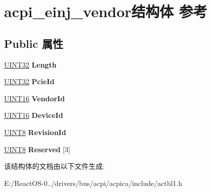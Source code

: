 \hypertarget{structacpi__einj__vendor}{}\section{acpi\+\_\+einj\+\_\+vendor结构体 参考}
\label{structacpi__einj__vendor}
\subsection*{Public 属性}
\begin{DoxyCompactItemize}
\item 
\mbox{\label{structacpi__einj__vendor_ab022b1c2b2f97624fa8f3c6d6956860f}} 
\hyperlink{_processor_bind_8h_ae1e6edbbc26d6fbc71a90190d0266018}{U\+I\+N\+T32} {\bfseries Length}
\item 
\mbox{\label{structacpi__einj__vendor_a0b31a8be0d24ead47e4321fdd5d7ec57}} 
\hyperlink{_processor_bind_8h_ae1e6edbbc26d6fbc71a90190d0266018}{U\+I\+N\+T32} {\bfseries Pcie\+Id}
\item 
\mbox{\label{structacpi__einj__vendor_ae98ed6cb710c90ef7fcc4b1a364ee571}} 
\hyperlink{_processor_bind_8h_a09f1a1fb2293e33483cc8d44aefb1eb1}{U\+I\+N\+T16} {\bfseries Vendor\+Id}
\item 
\mbox{\label{structacpi__einj__vendor_a0848c0802b4a8e1a7d9d8d412d630deb}} 
\hyperlink{_processor_bind_8h_a09f1a1fb2293e33483cc8d44aefb1eb1}{U\+I\+N\+T16} {\bfseries Device\+Id}
\item 
\mbox{\label{structacpi__einj__vendor_aa4a3d11dd6fc3b47ab571dab4133b4b7}} 
\hyperlink{_processor_bind_8h_ab27e9918b538ce9d8ca692479b375b6a}{U\+I\+N\+T8} {\bfseries Revision\+Id}
\item 
\mbox{\label{structacpi__einj__vendor_a1e73fb244b549c57887ef7763c0863f3}} 
\hyperlink{_processor_bind_8h_ab27e9918b538ce9d8ca692479b375b6a}{U\+I\+N\+T8} {\bfseries Reserved} \mbox{[}3\mbox{]}
\end{DoxyCompactItemize}


该结构体的文档由以下文件生成\+:\begin{DoxyCompactItemize}
\item 
E\+:/\+React\+O\+S-\/0../drivers/bus/acpi/acpica/include/actbl1.\+h\end{DoxyCompactItemize}
